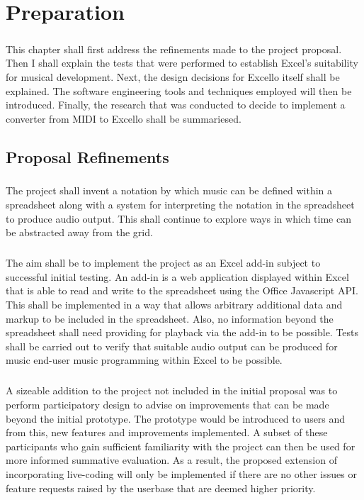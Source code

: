\chapter{Preparation}

\paragraph{} This chapter shall first address the refinements made to the project proposal. Then I shall explain the tests that were performed to establish Excel's suitability for musical development. Next, the design decisions for Excello itself shall be explained. The software engineering tools and techniques employed will then be introduced. Finally, the research that was conducted to decide to implement a converter from MIDI to Excello shall be summariesed.

\section{Proposal Refinements}

\paragraph{} The project shall invent a notation by which music can be defined within a spreadsheet along with a system for interpreting the notation in the spreadsheet to produce audio output. This shall continue to explore ways in which time can be abstracted away from the grid.

\paragraph{} The aim shall be to implement the project as an Excel add-in subject to successful initial testing. An add-in is a web application displayed within Excel that is able to read and write to the spreadsheet using the Office Javascript API. This shall be implemented in a way that allows arbitrary additional data and markup to be included in the spreadsheet. Also, no information beyond the spreadsheet shall need providing for playback via the add-in to be possible. Tests shall be carried out to verify that suitable audio output can be produced for music end-user music programming within Excel to be possible.

\paragraph{} A sizeable addition to the project not included in the initial proposal was to perform participatory design \cite{muller:pd} to advise on improvements that can be made beyond the initial prototype. The prototype would be introduced to users and from this, new features and improvements implemented. A subset of these participants who gain sufficient familiarity with the project can then be used for more informed summative evaluation. As a result, the proposed extension of incorporating live-coding will only be implemented if there are no other issues or feature requests raised by the userbase that are deemed higher priority.

